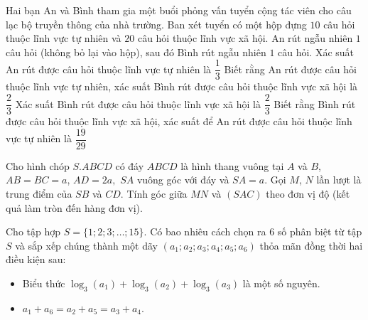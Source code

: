 \begin{ex} %
	Hai bạn An và Bình tham gia một buổi phỏng vấn tuyển cộng tác viên cho câu lạc bộ truyền thông của nhà trường. Ban xét tuyển có một hộp đựng $10$ câu hỏi thuộc lĩnh vực tự nhiên và $20$ câu hỏi thuộc lĩnh vực xã hội. An rút ngẫu nhiên $1$ câu hỏi (không bỏ lại vào hộp), sau đó Bình rút ngẫu nhiên $1$ câu hỏi.
	\choiceTF
	{\True Xác suất An rút được câu hỏi thuộc lĩnh vực tự nhiên là $\dfrac{1}{3}$}
	{Biết rằng An rút được câu hỏi thuộc lĩnh vực tự nhiên, xác suất Bình rút được câu hỏi thuộc lĩnh vực xã hội là $\dfrac{2}{3}$}
	{\True Xác suất Bình rút được câu hỏi thuộc lĩnh vực xã hội là $\dfrac{2}{3}$}
	{Biết rằng Bình rút được câu hỏi thuộc lĩnh vực xã hội, xác suất để An rút được câu hỏi thuộc lĩnh vực tự nhiên là $\dfrac{19}{29}$}
	\loigiai{
	}
\end{ex}
\caukq
\begin{ex} %
	Cho hình chóp $S.ABCD$ có đáy $ABCD$ là hình thang vuông tại $A$ và $B$, $AB=BC=a$, $AD=2a$$, $ $SA$ vuông góc với đáy và $SA=a$. Gọi $M$, $N$ lần lượt là trung điểm của $SB$ và $CD$. Tính góc giữa $MN$ và $(SAC)$ theo đơn vị độ (kết quả làm tròn đến hàng đơn vị).
		\par
	\loigiai{
	}
\end{ex}
\begin{ex} %
\par
{}
	\loigiai{
	}
\end{ex}
\begin{ex} %
	Cho tập hợp $S=\{1;2;3;\ldots;15\}$. Có bao nhiêu cách chọn ra $6$ số phân biệt từ tập $S$ và sắp xếp chúng thành một dãy $\left(a_1;a_2;a_3;a_4;a_5;a_6\right)$ thỏa mãn đồng thời hai điều kiện sau:
	\begin{itemize}
		\item Biểu thức $\log _3\left(a_1\right)+\log _3\left(a_2\right)+\log _3\left(a_3\right)$ là một số nguyên.
		\item $a_1+a_6=a_2+a_5=a_3+a_4$.
	\end{itemize}
		\par
	\loigiai{
	}
\end{ex}
